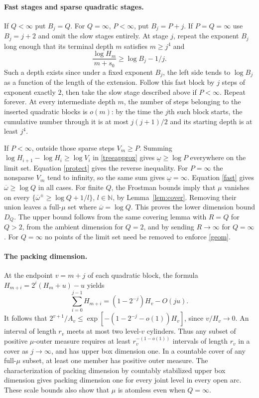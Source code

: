 \documentclass[11pt]{article}
\newcommand{\n}{\mathbb N}
\newcommand{\upexp}{\overline\omega}
\newcommand{\lowexp}{\underline\omega}
\begin{document}
\paragraph{Fast stages and sparse quadratic stages.}
If $Q<\infty$ put $B_j=Q$. For $Q=\infty$, $P<\infty$, put $B_j=P+j$. If $P=Q=\infty$ use $B_j=j+2$ and omit the slow stages entirely. At stage $j$, repeat the exponent $B_j$ long enough that its terminal depth $m$ satisfies $m\ge j^4$ and
\begin{equation}\label{fast}
 \frac{\log H_m}{m+s_0}\ge\log B_j-1/j .
\end{equation}
Such a depth exists since under a fixed exponent $B_j$, the left side tends to $\log B_j$ as a function of the length of the extension. Follow this fast block by $j$ steps of exponent exactly $2$, then take the slow stage described above if $P<\infty$. Repeat forever. At every intermediate depth $m$, the number of steps belonging to the inserted quadratic blocks is $o(m)$: by the time the $j$th such block starts, the cumulative number through it is at most $j(j+1)/2$ and its starting depth is at least $j^4$.

If $P<\infty$, outside those sparse steps $V_m\ge P$. Summing $\log H_{i+1}-\log H_i\ge\log V_i$ in \eqref{treeapprox} gives $\lowexp\ge\log P$ everywhere on the limit set. Equation \eqref{protect} gives the reverse inequality. For $P=\infty$ the nonsparse $V_m$ tend to infinity, so the same sum gives $\lowexp=\infty$. Equation \eqref{fast} gives $\upexp\ge\log Q$ in all cases. For finite $Q$, the Frostman bounds imply that $\mu$ vanishes on every $\{\upexp^\pm\ge\log Q+1/l\}$, $l\in\n$, by Lemma~\ref{lem:cover}. Removing their union leaves a full-$\mu$ set where $\upexp=\log Q$. This proves the lower dimension bound $D_Q$. The upper bound follows from the same covering lemma with $R=Q$ for $Q>2$, from the ambient dimension for $Q=2$, and by sending $R\to\infty$ for $Q=\infty$. For $Q=\infty$ no points of the limit set need be removed to enforce \eqref{geom}.

\paragraph{The packing dimension.}
At the endpoint $v=m+j$ of each quadratic block, the formula $H_{m+i}=2^i(H_m+u)-u$ yields
\[
 \sum_{i=0}^{j-1}H_{m+i}=(1-2^{-j})H_v-O(ju).
\]
It follows that $2^{v+1}/A_v\le\exp[-(1-2^{-j}-o(1))H_v]$, since $v/H_v\to0$. An interval of length $r_v$ meets at most two level-$v$ cylinders. Thus any subset of positive $\mu$-outer measure requires at least $r_v^{-(1-o(1))}$ intervals of length $r_v$ in a cover as $j\to\infty$, and has upper box dimension one. In a countable cover of any full-$\mu$ subset, at least one member has positive outer measure. The characterization of packing dimension by countably stabilized upper box dimension \cite{falconer} gives packing dimension one for every joint level in every open arc. These scale bounds also show that $\mu$ is atomless even when $Q=\infty$.
\end{document}
